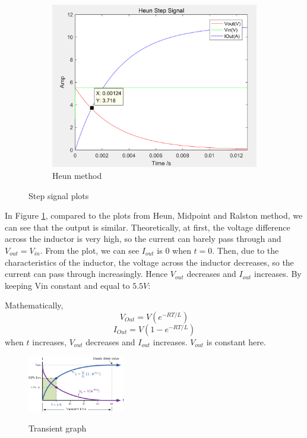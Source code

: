 \documentclass[a4paper, 12pt]{article}
\begin{document}
\begin{figure}
      \begin{subfigure}{0.4\textwidth}
            \includegraphics[width=\textwidth]{ex1/heun_step.PNG}
            \caption{Heun method}
      \end{subfigure}
      \caption{Step signal plots}
\label{fig:Step signal plots}
\end{figure}

In Figure \ref{fig:Step signal plots}, compared to the plots from Heun, Midpoint and Ralston method, we can see that the output is similar. Theoretically, at first, the voltage difference across the inductor is very high, so the current can barely pass through and $V_{out} = V_{in}$. From the plot, we can see $I_{out}$ is $0$ when $t = 0$. Then, due to the characteristics of the inductor, the voltage across the inductor decreases, so the current can pass through increasingly. Hence $V_{out}$ decreases and $I_{out}$ increases. By keeping Vin constant and equal to $5.5V$:

Mathematically, \[V_{Out} = V(e^{-RT/L})\] \[I_{Out} = V(1-e^{-RT/L})\]
when $t$ increases, $V_{out}$ decreases and $I_{out}$ increases. $V_{out}$ is constant here.

\begin{figure}
\centering
\includegraphics[width=0.38\textwidth]{ex1/heun_step_transient.png}
\caption{Transient graph}
\cite{lrtransient}
\end{figure}
\end{document}

